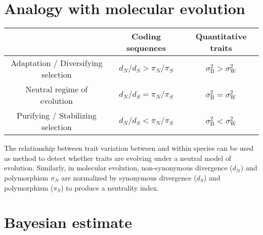 \documentclass{article}
\newcommand{\dn}{d_N}
\newcommand{\ds}{d_S}
\newcommand{\dnds}{\dn / \ds}
\newcommand{\pn}{\pi_N}
\newcommand{\ps}{\pi_S}
\newcommand{\pnps}{\pn / \ps}
\newcommand{\RatePhy}{\sigma^2_{\mathrm{B}}}
\newcommand{\RatePop}{\sigma^2_{\mathrm{W}}}
\begin{document}
\section{Analogy with molecular evolution}

\begin{center}
    \scriptsize
    \begin{adjustbox}{width = 0.5\textwidth}
        \begin{tabular}{|c||c|c|}
            \hline
            & Coding sequences & Quantitative traits \\ \hline \hline
            Adaptation / Diversifying selection & $\dnds > \pnps$ & $ \RatePhy > \RatePop  $ \\ \hline
            Neutral regime of evolution & $\dnds = \pnps$ & $ \RatePhy = \RatePop  $ \\ \hline
            Purifying / Stabilizing selection & $\dnds < \pnps$ & $ \RatePhy < \RatePop  $ \\ \hline
        \end{tabular}
    \end{adjustbox}
\end{center}
The relationship between trait variation between and within species can be used as method to detect whether traits are evolving under a neutral model of evolution.
Similarly, in molecular evolution, non-synonymous divergence ($\dn$) and polymorphism $\pn$ are normalized by synonymous divergence ($\ds$) and polymorphism ($\ps$) to produce a neutrality index\cite{mcdonald_adaptative_1991, fay_evaluating_2008}.

\section{Bayesian estimate}
\end{document}
